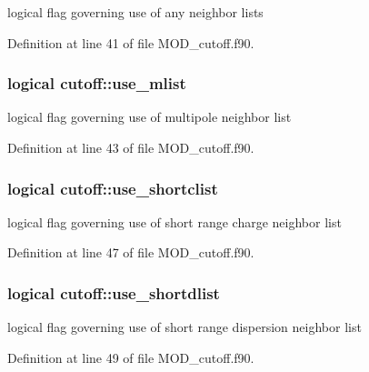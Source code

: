 logical flag governing use of any neighbor lists 



Definition at line 41 of file M\-O\-D\-\_\-cutoff.\-f90.

\hypertarget{classcutoff_a78501eaa9effc92e56a52d0651abb70c}{
\subsubsection[{use\-\_\-mlist}]{\setlength{\rightskip}{0pt plus 5cm}logical cutoff\-::use\-\_\-mlist}}\label{classcutoff_a78501eaa9effc92e56a52d0651abb70c}


logical flag governing use of multipole neighbor list 



Definition at line 43 of file M\-O\-D\-\_\-cutoff.\-f90.

\hypertarget{classcutoff_a7f60ea68482e53cd6aeaa473aa5df2f7}{
\subsubsection[{use\-\_\-shortclist}]{\setlength{\rightskip}{0pt plus 5cm}logical cutoff\-::use\-\_\-shortclist}}\label{classcutoff_a7f60ea68482e53cd6aeaa473aa5df2f7}


logical flag governing use of short range charge neighbor list 



Definition at line 47 of file M\-O\-D\-\_\-cutoff.\-f90.

\hypertarget{classcutoff_afe3f26d96ac426c3ef7c8d2c4304538c}{
\subsubsection[{use\-\_\-shortdlist}]{\setlength{\rightskip}{0pt plus 5cm}logical cutoff\-::use\-\_\-shortdlist}}\label{classcutoff_afe3f26d96ac426c3ef7c8d2c4304538c}


logical flag governing use of short range dispersion neighbor list 



Definition at line 49 of file M\-O\-D\-\_\-cutoff.\-f90.

